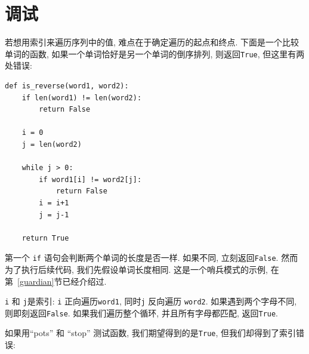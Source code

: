 \documentclass[10pt]{book}
\begin{document}
\section{调试}

若想用索引来遍历序列中的值, 难点在于确定遍历的起点和终点. 
下面是一个比较单词的函数, 如果一个单词恰好是另一个单词的倒序排列, 
则返回{\tt True}, 但这里有两处错误:

\begin{verbatim}
def is_reverse(word1, word2):
    if len(word1) != len(word2):
        return False
    
    i = 0
    j = len(word2)

    while j > 0:
        if word1[i] != word2[j]:
            return False
        i = i+1
        j = j-1

    return True
\end{verbatim}
%
第一个 {\tt if} 语句会判断两个单词的长度是否一样. 
如果不同, 立刻返回{\tt False}. 
然而为了执行后续代码, 我们先假设单词长度相同. 
这是一个哨兵模式的示例, 在第~\ref{guardian}节已经介绍过. 

{\tt i} 和 {\tt j}是索引: {\tt i} 正向遍历{\tt word1}, 同时{\tt j} 反向遍历
{\tt word2}. 如果遇到两个字母不同, 则即刻返回{\tt False}. 
如果我们遍历整个循环, 并且所有字母都匹配, 返回{\tt True}. 

如果用``pots'' 和 ``stop'' 测试函数, 我们期望得到的是{\tt True}, 
但我们却得到了索引错误:
\end{document}
